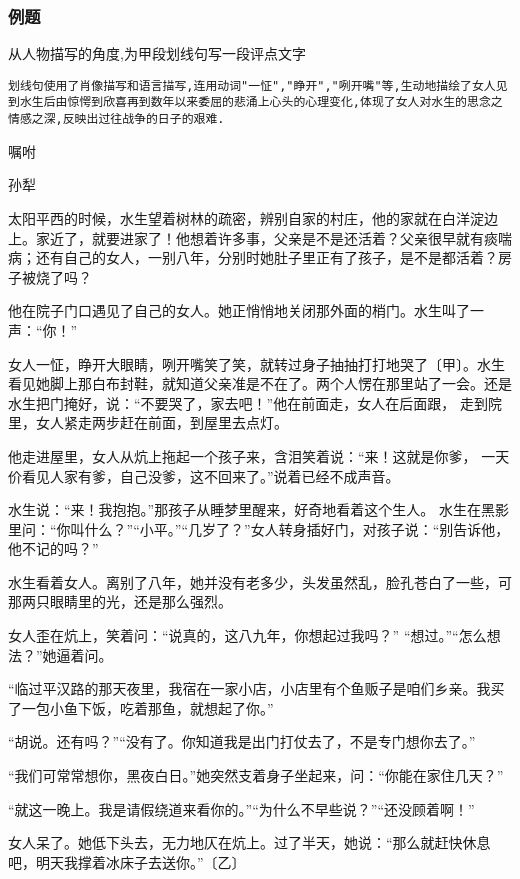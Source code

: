 \documentclass{ctexart}
\newcommand{\nm}{\normalsize}
\renewcommand{\\}{\par}
\begin{document}
\subsubsection{例题}
\large 
从人物描写的角度,为甲段划线句写一段评点文字\\
\texttt{划线句使用了肖像描写和语言描写,连用动词"一怔","睁开","咧开嘴"等,生动地描绘了女人见到水生后由惊愕到欣喜再到数年以来委屈的悲涌上心头的心理变化,体现了女人对水生的思念之情感之深,反映出过往战争的日子的艰难.}\\
\nm \fangsong \\\begin{center}嘱咐\end{center}\\\begin{center}孙犁\end{center}\\太阳平西的时候，水生望着树林的疏密，辨别自家的村庄，他的家就在白洋淀边上。家近了，就要进家了！他想着许多事，父亲是不是还活着？父亲很早就有痰喘病；还有自己的女人，一别八年，分别时她肚子里正有了孩子，是不是都活着？房子被烧了吗？\\他在院子门口遇见了自己的女人。她正悄悄地关闭那外面的梢门。水生叫了一声：“你！”\\女人一怔，睁开大眼睛，咧开嘴笑了笑，就转过身子抽抽打打地哭了〔甲〕。水生看见她脚上那白布封鞋，就知道父亲准是不在了。两个人愣在那里站了一会。还是水生把门掩好，说：“不要哭了，家去吧！”他在前面走，女人在后面跟， 走到院里，女人紧走两步赶在前面，到屋里去点灯。\\他走进屋里，女人从炕上拖起一个孩子来，含泪笑着说：“来！这就是你爹， 一天价看见人家有爹，自己没爹，这不回来了。”说着已经不成声音。\\水生说：“来！我抱抱。”那孩子从睡梦里醒来，好奇地看着这个生人。 水生在黑影里问：“你叫什么？”“小平。”“几岁了？”女人转身插好门，对孩子说：“别告诉他，他不记的吗？”\\水生看着女人。离别了八年，她并没有老多少，头发虽然乱，脸孔苍白了一些，可那两只眼睛里的光，还是那么强烈。\\
女人歪在炕上，笑着问：“说真的，这八九年，你想起过我吗？” “想过。”“怎么想法？”她逼着问。\\“临过平汉路的那天夜里，我宿在一家小店，小店里有个鱼贩子是咱们乡亲。我买了一包小鱼下饭，吃着那鱼，就想起了你。”\\“胡说。还有吗？”“没有了。你知道我是出门打仗去了，不是专门想你去了。”\\“我们可常常想你，黑夜白日。”她突然支着身子坐起来，问：“你能在家住几天？”\\“就这一晚上。我是请假绕道来看你的。”“为什么不早些说？”“还没顾着啊！”\\女人呆了。她低下头去，无力地仄在炕上。过了半天，她说：“那么就赶快休息吧，明天我撑着冰床子去送你。”〔乙〕
\end{document}
